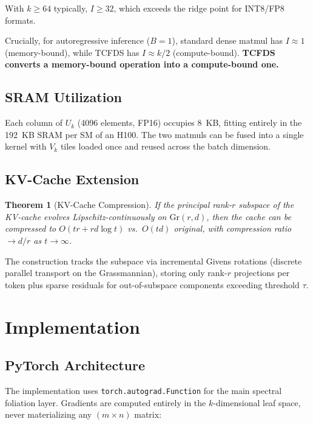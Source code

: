 \documentclass[11pt,a4paper]{article}
\newtheorem{theorem}{Theorem}
\begin{document}
With $k \geq 64$ typically, $I \geq 32$, which exceeds the ridge point for INT8/FP8 formats.

Crucially, for autoregressive inference ($B=1$), standard dense matmul has $I \approx 1$ (memory-bound), while TCFDS has $I \approx k/2$ (compute-bound). \textbf{TCFDS converts a memory-bound operation into a compute-bound one.}

\subsection{SRAM Utilization}

Each column of $U_k$ (4096 elements, FP16) occupies 8~KB, fitting entirely in the 192~KB SRAM per SM of an H100. The two matmuls can be fused into a single kernel with $V_k$ tiles loaded once and reused across the batch dimension.

\subsection{KV-Cache Extension}

\begin{theorem}[KV-Cache Compression]\label{thm:kvcache}
If the principal rank-$r$ subspace of the KV-cache evolves Lipschitz-continuously on $\mathrm{Gr}(r,d)$, then the cache can be compressed to $O(tr + rd\log t)$ vs.\ $O(td)$ original, with compression ratio $\to d/r$ as $t \to \infty$.
\end{theorem}

The construction tracks the subspace via incremental Givens rotations (discrete parallel transport on the Grassmannian), storing only rank-$r$ projections per token plus sparse residuals for out-of-subspace components exceeding threshold $\tau$.

\section{Implementation}

\subsection{PyTorch Architecture}

The implementation uses \texttt{torch.autograd.Function} for the main spectral foliation layer. Gradients are computed entirely in the $k$-dimensional leaf space, never materializing any $(m \times n)$ matrix:
\end{document}
